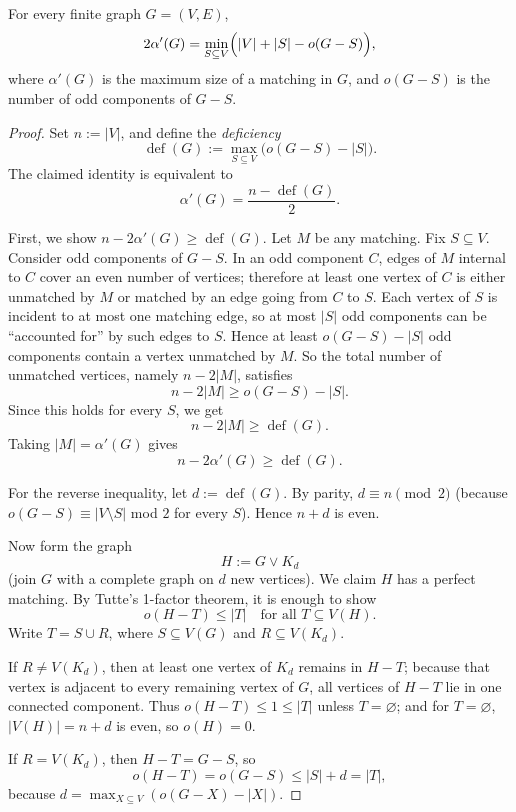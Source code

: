 \begin{theorem}
For every finite graph $G=(V,E)$,
\[
2\alpha'(G)=\min_{S\subseteq V}\Bigl(|V|+|S|-o(G-S)\Bigr),
\]
where $\alpha'(G)$ is the maximum size of a matching in $G$, and
$o(G-S)$ is the number of odd components of $G-S$.
\end{theorem}

\begin{proof}
Set $n:=|V|$, and define the \emph{deficiency}
\[
\operatorname{def}(G):=\max_{S\subseteq V}\bigl(o(G-S)-|S|\bigr).
\]
The claimed identity is equivalent to
\[
\alpha'(G)=\frac{n-\operatorname{def}(G)}{2}.
\]

First, we show $n-2\alpha'(G)\ge \operatorname{def}(G)$. Let $M$ be any matching.
Fix $S\subseteq V$. Consider odd components of $G-S$.
In an odd component $C$, edges of $M$ internal to $C$ cover an even number of vertices;
therefore at least one vertex of $C$ is either unmatched by $M$ or matched by an edge going from $C$ to $S$.
Each vertex of $S$ is incident to at most one matching edge, so at most $|S|$ odd components can be ``accounted for'' by such edges to $S$.
Hence at least $o(G-S)-|S|$ odd components contain a vertex unmatched by $M$.
So the total number of unmatched vertices, namely $n-2|M|$, satisfies
\[
n-2|M|\ge o(G-S)-|S|.
\]
Since this holds for every $S$, we get
\[
n-2|M|\ge \operatorname{def}(G).
\]
Taking $|M|=\alpha'(G)$ gives
\[
n-2\alpha'(G)\ge \operatorname{def}(G).\tag{1}
\]

For the reverse inequality, let $d:=\operatorname{def}(G)$.
By parity, $d\equiv n \pmod 2$ (because $o(G-S)\equiv |V\setminus S|$ mod $2$ for every $S$).
Hence $n+d$ is even.

Now form the graph
\[
H:=G\vee K_d
\]
(join $G$ with a complete graph on $d$ new vertices).
We claim $H$ has a perfect matching.
By Tutte's 1-factor theorem, it is enough to show
\[
o(H-T)\le |T| \quad \text{for all } T\subseteq V(H).
\]
Write $T=S\cup R$, where $S\subseteq V(G)$ and $R\subseteq V(K_d)$.

If $R\neq V(K_d)$, then at least one vertex of $K_d$ remains in $H-T$; because that vertex is adjacent to every remaining vertex of $G$, all vertices of $H-T$ lie in one connected component. Thus $o(H-T)\le 1\le |T|$ unless $T=\varnothing$; and for $T=\varnothing$, $|V(H)|=n+d$ is even, so $o(H)=0$.

If $R=V(K_d)$, then $H-T=G-S$, so
\[
o(H-T)=o(G-S)\le |S|+d=|T|,
\]
because $d=\max_{X\subseteq V}(o(G-X)-|X|)$.


\end{proof}
